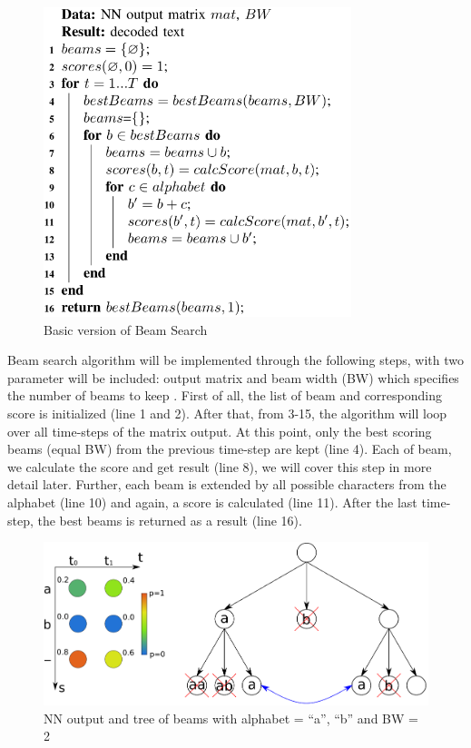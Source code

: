       \begin{figure}[H]
        \centering
        \includegraphics[width=0.8\textwidth]{img/Chap3/Basic-Version-BeamSearch}
        \caption{ Basic version of Beam Search }
        \label{fig:Chap3-Basic-Version-BeamSearch}
      \end{figure}
      
      
      Beam search algorithm will be implemented through the following steps, with two
      parameter will be included: output matrix and beam width (BW) which specifies the number
      of beams to keep . First of all, the list of beam and corresponding score is 
      initialized (line 1 and 2). After that, from 3-15, the algorithm will loop over all time-steps
      of the matrix output. At this point, only the best scoring beams (equal BW) from the previous
      time-step are kept (line 4). Each of beam, we calculate the score and get result (line 8), we will cover
      this step in more detail later. Further, each beam is extended by all possible characters from
      the alphabet (line 10) and again, a score is calculated (line 11). After the last time-step,
      the best beams is returned as a result (line 16).


      \begin{figure}[H]
        \centering
        \includegraphics[width=\textwidth]{img/Chap3/BeamSearchTree}
        \caption{ NN output and tree of beams with alphabet = {“a”, “b”} and BW = 2 }
        \label{fig:Chap3-BSTree}
      \end{figure}

